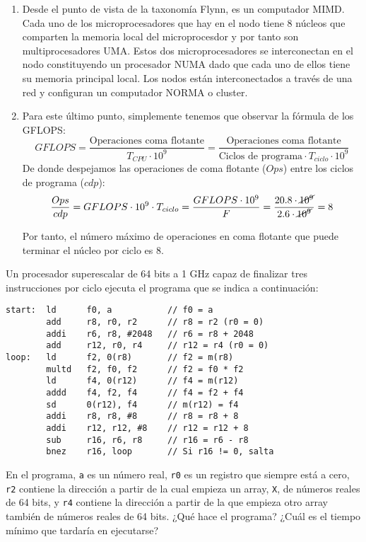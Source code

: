 \begin{ejercicio}
\begin{enumerate}
        \item Desde el punto de vista de la taxonomía Flynn, es un computador MIMD. Cada uno de los microprocesadores que hay en el nodo tiene 8 núcleos que comparten la memoria local del microprocesdor y por tanto son multiprocesadores UMA. Estos dos microprocesadores se interconectan en el nodo constituyendo un procesador NUMA dado que cada uno de ellos tiene su memoria principal local. Los nodos están interconectados a través de una red y configuran un computador NORMA o cluster.

        \item Para este último punto, simplemente tenemos que observar la fórmula de los GFLOPS:
            \begin{equation*}
                GFLOPS = \dfrac{\text{Operaciones coma flotante}}{T_{CPU}\cdot 10^9} = \dfrac{\text{Operaciones coma flotante}}{\text{Ciclos de programa} \cdot T_{ciclo}\cdot 10^9} 
            \end{equation*}
            De donde despejamos las operaciones de coma flotante ($Ops$) entre los ciclos de programa ($cdp$):
            \begin{equation*}
                \dfrac{Ops}{cdp} = GFLOPS \cdot 10^9\cdot T_{ciclo} = \dfrac{GFLOPS \cdot 10^9}{F} = \dfrac{20.8\cdot \cancel{10^9}}{2.6\cdot \cancel{10^9}} = 8
            \end{equation*}
            
            Por tanto, el número máximo de operaciones en coma flotante que puede terminar el núcleo por ciclo es 8.
    \end{enumerate}
\end{ejercicio}

\begin{ejercicio}
    Un procesador superescalar de 64 bits a 1 GHz capaz de finalizar tres instrucciones por ciclo ejecuta el programa que se indica a continuación:
    \begin{verbatim}
start:  ld      f0, a           // f0 = a
        add     r8, r0, r2      // r8 = r2 (r0 = 0)
        addi    r6, r8, #2048   // r6 = r8 + 2048
        add     r12, r0, r4     // r12 = r4 (r0 = 0)
loop:   ld      f2, 0(r8)       // f2 = m(r8)
        multd   f2, f0, f2      // f2 = f0 * f2
        ld      f4, 0(r12)      // f4 = m(r12)
        addd    f4, f2, f4      // f4 = f2 + f4
        sd      0(r12), f4      // m(r12) = f4
        addi    r8, r8, #8      // r8 = r8 + 8
        addi    r12, r12, #8    // r12 = r12 + 8
        sub     r16, r6, r8     // r16 = r6 - r8
        bnez    r16, loop       // Si r16 != 0, salta
    \end{verbatim}

    En el programa, \verb|a| es un número real, \verb|r0| es un registro que siempre está a cero, \verb|r2| contiene la dirección a partir de la cual empieza un array, \verb|X|, de números reales de 64 bits, y \verb|r4| contiene la dirección a partir de la que empieza otro array también de números reales de 64 bits. ¿Qué hace el programa? ¿Cuál es el tiempo mínimo que tardaría en ejecutarse?
\end{ejercicio}



\newpage

